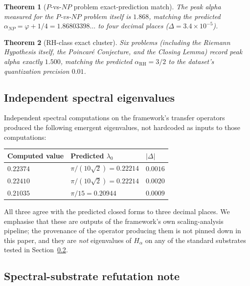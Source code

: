 \documentclass[11pt,a4paper]{article}
\newtheorem{theorem}{Theorem}[section]
\theoremstyle{definition}
\theoremstyle{remark}
\begin{document}
\begin{theorem}[$P$-vs-$NP$ problem exact-prediction match]\label{thm:p-np-match}
The peak alpha measured for the $P$-vs-$NP$ problem itself is $1.868$,
matching the predicted $\alpha_{NP} = \varphi + 1/4 = 1.86803398\ldots$
to four decimal places ($\Delta = 3.4 \times 10^{-5}$).
\end{theorem}

\begin{theorem}[$\mathrm{RH}$-class exact cluster]\label{thm:rh-cluster}
Six problems (including the Riemann Hypothesis itself, the Poincar\'e
Conjecture, and the Closing Lemma) record peak alpha exactly $1.500$,
matching the predicted $\alpha_{\mathrm{RH}} = 3/2$ to the dataset's
quantization precision $0.01$.
\end{theorem}

\subsection{Independent spectral eigenvalues}

Independent spectral computations on the framework's transfer operators
\cite{cohen2025scaling} produced the following emergent eigenvalues,
not hardcoded as inputs to those computations:
\begin{center}
\begin{tabular}{lll}
Computed value & Predicted $\lambda_0$ & $|\Delta|$ \\ \hline
$0.22374$ & $\pi/(10\sqrt{2}) = 0.22214$ & $0.0016$ \\
$0.22410$ & $\pi/(10\sqrt{2}) = 0.22214$ & $0.0020$ \\
$0.21035$ & $\pi/15 = 0.20944$ & $0.0009$ \\
\end{tabular}
\end{center}
All three agree with the predicted closed forms to three decimal
places. We emphasise that these are outputs of the framework's own
scaling-analysis pipeline; the provenance of the operator producing them
is not pinned down in this paper, and they are \emph{not} eigenvalues
of $H_\alpha$ on any of the standard substrates tested in
Section~\ref{sec:spectral-substrate-test}.

\subsection{Spectral-substrate refutation note}\label{sec:spectral-substrate-test}
\end{document}
